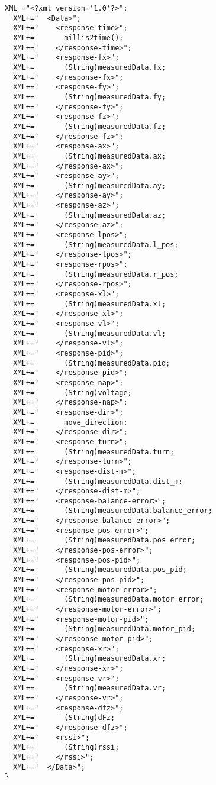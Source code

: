 \documentclass[a4paper,12pt,twoside,openany]{report}
\begin{document}
\begin{lstlisting}[style=customcpp]
  XML ="<?xml version='1.0'?>";
  XML+="  <Data>"; 
  XML+="    <response-time>";
  XML+=       millis2time();
  XML+="    </response-time>";
  XML+="    <response-fx>";
  XML+=       (String)measuredData.fx;
  XML+="    </response-fx>";
  XML+="    <response-fy>";
  XML+=       (String)measuredData.fy;
  XML+="    </response-fy>";
  XML+="    <response-fz>";
  XML+=       (String)measuredData.fz;
  XML+="    </response-fz>";
  XML+="    <response-ax>";
  XML+=       (String)measuredData.ax;
  XML+="    </response-ax>";
  XML+="    <response-ay>";
  XML+=       (String)measuredData.ay;
  XML+="    </response-ay>";
  XML+="    <response-az>";
  XML+=       (String)measuredData.az;
  XML+="    </response-az>";
  XML+="    <response-lpos>";
  XML+=       (String)measuredData.l_pos;
  XML+="    </response-lpos>";
  XML+="    <response-rpos>";
  XML+=       (String)measuredData.r_pos;
  XML+="    </response-rpos>";
  XML+="    <response-xl>";
  XML+=       (String)measuredData.xl;
  XML+="    </response-xl>";
  XML+="    <response-vl>";
  XML+=       (String)measuredData.vl;
  XML+="    </response-vl>";
  XML+="    <response-pid>";
  XML+=       (String)measuredData.pid;
  XML+="    </response-pid>";
  XML+="    <response-nap>";
  XML+=       (String)voltage;
  XML+="    </response-nap>";
  XML+="    <response-dir>";
  XML+=       move_direction;
  XML+="    </response-dir>";
  XML+="    <response-turn>";
  XML+=       (String)measuredData.turn;
  XML+="    </response-turn>";
  XML+="    <response-dist-m>";
  XML+=       (String)measuredData.dist_m;
  XML+="    </response-dist-m>";
  XML+="    <response-balance-error>";
  XML+=       (String)measuredData.balance_error;
  XML+="    </response-balance-error>";
  XML+="    <response-pos-error>";
  XML+=       (String)measuredData.pos_error;
  XML+="    </response-pos-error>";
  XML+="    <response-pos-pid>";
  XML+=       (String)measuredData.pos_pid;
  XML+="    </response-pos-pid>";
  XML+="    <response-motor-error>";
  XML+=       (String)measuredData.motor_error;
  XML+="    </response-motor-error>";
  XML+="    <response-motor-pid>";
  XML+=       (String)measuredData.motor_pid;
  XML+="    </response-motor-pid>";
  XML+="    <response-xr>";
  XML+=       (String)measuredData.xr;
  XML+="    </response-xr>";
  XML+="    <response-vr>";
  XML+=       (String)measuredData.vr;
  XML+="    </response-vr>";
  XML+="    <response-dfz>";
  XML+=       (String)dFz;
  XML+="    </response-dfz>";
  XML+="    <rssi>";
  XML+=       (String)rssi;
  XML+="    </rssi>";
  XML+="  </Data>"; 
}
\end{lstlisting}
\end{document}
